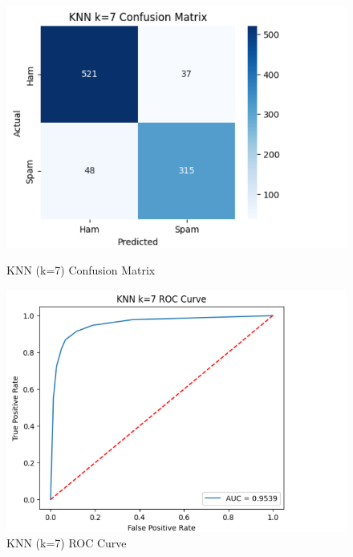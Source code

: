 \documentclass[12pt]{article}
\begin{document}
\begin{figure}[H]
\centering
\begin{minipage}{0.45\textwidth}
\centering
\includegraphics[width=\linewidth]{18.png}
\caption{KNN (k=7) Confusion Matrix}
\end{minipage}
\hfill
\begin{minipage}{0.45\textwidth}
\centering
\includegraphics[width=\linewidth]{19.png}
\caption{KNN (k=7) ROC Curve}
\end{minipage}
\end{figure}
\end{document}

